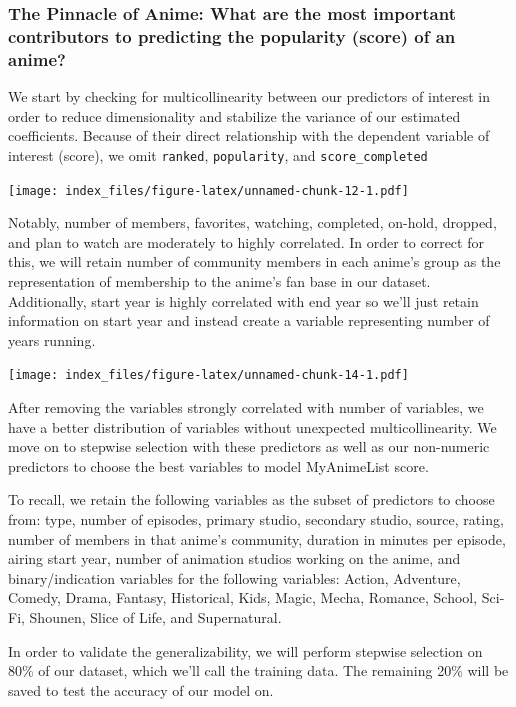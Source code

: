 \documentclass[
]{article}
\begin{document}
\hypertarget{the-pinnacle-of-anime-what-are-the-most-important-contributors-to-predicting-the-popularity-score-of-an-anime}{%
\subsubsection{The Pinnacle of Anime: What are the most important
contributors to predicting the popularity (score) of an
anime?}\label{the-pinnacle-of-anime-what-are-the-most-important-contributors-to-predicting-the-popularity-score-of-an-anime}}

We start by checking for multicollinearity between our predictors of
interest in order to reduce dimensionality and stabilize the variance of
our estimated coefficients. Because of their direct relationship with
the dependent variable of interest (score), we omit \texttt{ranked},
\texttt{popularity}, and \texttt{score\_completed}

\texttt{[image: index\_files/figure-latex/unnamed-chunk-12-1.pdf]}

Notably, number of members, favorites, watching, completed, on-hold,
dropped, and plan to watch are moderately to highly correlated. In order
to correct for this, we will retain number of community members in each
anime's group as the representation of membership to the anime's fan
base in our dataset. Additionally, start year is highly correlated with
end year so we'll just retain information on start year and instead
create a variable representing number of years running.

\texttt{[image: index\_files/figure-latex/unnamed-chunk-14-1.pdf]}

After removing the variables strongly correlated with number of
variables, we have a better distribution of variables without unexpected
multicollinearity. We move on to stepwise selection with these
predictors as well as our non-numeric predictors to choose the best
variables to model MyAnimeList score.

To recall, we retain the following variables as the subset of predictors
to choose from: type, number of episodes, primary studio, secondary
studio, source, rating, number of members in that anime's community,
duration in minutes per episode, airing start year, number of animation
studios working on the anime, and binary/indication variables for the
following variables: Action, Adventure, Comedy, Drama, Fantasy,
Historical, Kids, Magic, Mecha, Romance, School, Sci-Fi, Shounen, Slice
of Life, and Supernatural.

In order to validate the generalizability, we will perform stepwise
selection on 80\% of our dataset, which we'll call the training data.
The remaining 20\% will be saved to test the accuracy of our model on.
\end{document}
